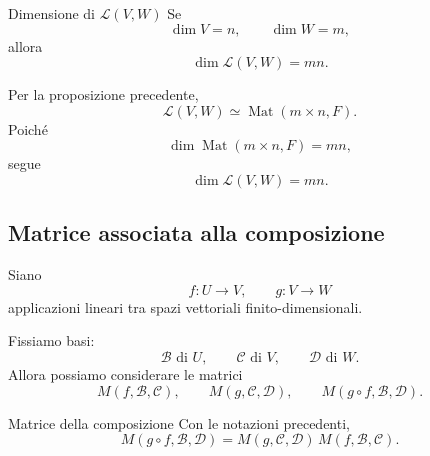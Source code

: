 \documentclass[a4paper]{article}
\begin{document}
\begin{snippetcorollary}{Dimensione di \(\mathcal{L}(V,W)\)}
    Se
    \[
        \dim V=n,
        \qquad
        \dim W=m,
    \]
    allora
    \[
        \dim \mathcal{L}(V,W)=mn.
    \]
\end{snippetcorollary}

\begin{snippetproof}{}
    Per la proposizione precedente,
    \[
        \mathcal{L}(V,W)\simeq \operatorname{Mat}(m\times n,F).
    \]
    Poiché
    \[
        \dim \operatorname{Mat}(m\times n,F)=mn,
    \]
    segue
    \[
        \dim \mathcal{L}(V,W)=mn.
    \]
\end{snippetproof}

\subsection{Matrice associata alla composizione}

Siano
\[
    f:U\to V,
    \qquad
    g:V\to W
\]
applicazioni lineari tra spazi vettoriali finito-dimensionali.

Fissiamo basi:
\[
    \mathcal{B}\text{ di }U,
    \qquad
    \mathcal{C}\text{ di }V,
    \qquad
    \mathcal{D}\text{ di }W.
\]
Allora possiamo considerare le matrici
\[
    M(f,\mathcal{B},\mathcal{C}),
    \qquad
    M(g,\mathcal{C},\mathcal{D}),
    \qquad
    M(g\circ f,\mathcal{B},\mathcal{D}).
\]

\begin{snippettheorem}{Matrice della composizione}
    Con le notazioni precedenti,
    \[
        M(g\circ f,\mathcal{B},\mathcal{D})
        =
        M(g,\mathcal{C},\mathcal{D})\,
        M(f,\mathcal{B},\mathcal{C}).
    \]
\end{snippettheorem}
\end{document}
